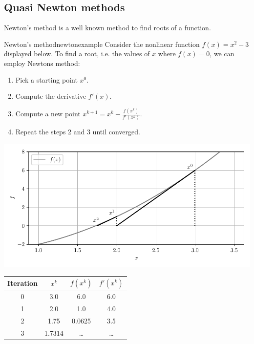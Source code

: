 \subsection{Quasi Newton methods}
Newton's method is a well known method to find roots of a function. 

\begin{example}{Newton's method}{newtonexample}
    Consider the nonlinear function $f(x) = x^2 - 3$ displayed below. To find a root, i.e. the values of $x$ where $f(x)=0$, we can employ Newtons method: 
    \begin{enumerate}
        \item Pick a starting point $x^0$.
        \item Compute the derivative $f'(x)$.
        \item Compute a new point $x^{k+1} = x^k - \frac{f(x^k)}{f'(x^k)}$.
        \item Repeat the steps 2 and 3 until converged.
    \end{enumerate}
    
    \includegraphics[width=\textwidth]{figures/netwon_iteration.pdf}
    \begin{center}    
        \begin{tabular}{cccc}
    
             Iteration  & $x^k$     & $f(x^k)$  & $f'(x^k)$\\
             \hline
             0          & 3.0       & 6.0       & 6.0\\
             1          & 2.0       & 1.0       & 4.0\\
             2          & 1.75      & 0.0625    & 3.5\\
             3          & 1.7314    & \dots     & \dots\\
        \end{tabular}
    \end{center}
\end{example}


